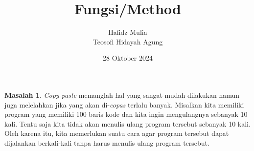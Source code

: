 \documentclass[aspectratio=169]{beamer}
\author[Tew \& Haf]{Hafidz Mulia\\Teosofi Hidayah Agung}
\date{28 Oktober 2024}
\title[Alpro 1 - Week 7]{Fungsi/Method}
\institute[Matematika ITS]{Departemen Matematika\\ Institut Teknologi Sepuluh Nopember}
\theoremstyle{definition}
\newtheorem*{masalah}{Masalah}
\begin{document}
    {
    \begin{frame}
        \titlepage
    \end{frame}
    }


    \begin{frame}
        \begin{masalah}
            \textit{Copy-paste} memanglah hal yang sangat mudah dilakukan namun juga melelahkan jika yang akan di-\textit{copas} terlalu banyak. Misalkan kita memiliki program yang memiliki 100 baris kode dan kita ingin mengulangnya sebanyak 10 kali. Tentu saja kita tidak akan menulis ulang program tersebut sebanyak 10 kali. Oleh karena itu, kita memerlukan suatu cara agar program tersebut dapat dijalankan berkali-kali tanpa harus menulis ulang program tersebut.
        \end{masalah}
    \end{frame}
\end{document}
